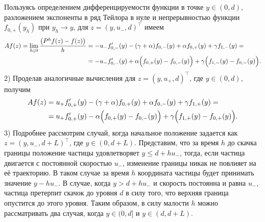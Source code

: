 \documentclass[12pt,a4paper]{article}
\begin{document}
Пользуясь определением дифференцируемости функции в точке $y \in (0, d)$, разложением экспоненты в ряд Тейлора в нуле и непрерывностью функции $f_{0,+} (y_h)$ при $y_h \to y$, для $z = \left(y, u_-, d\right)^\intercal$ имеем 
\begin{equation*}
    \begin{aligned}
   A f(z) = \lim_{h \downarrow 0} \frac{\left( P^h f(z) - f(z) \right)}{h} &= -u_- f_{0,-}' (y) - (\gamma + \alpha) f_{0,-}(y) + \alpha f_{0,+} (y) + \gamma f_{1,-} (y) = \\
   &= -u_- f_{0,-}' (y) + \alpha \Bigl(f_{0,+}(y) - f_{0,-}(y) \Bigr) + \gamma \Bigl(f_{1,-} (y) - f_{0,-} (y) \Bigr).
    \end{aligned}
\end{equation*}
2) Проделав аналогичные вычисления для $z = \left(y, u_+, d\right)^\intercal$, где $y \in (0, d)$, получим
\begin{equation*}
    \begin{aligned}
   A f(z) &= u_+ f_{0,+}' (y) - (\gamma + \alpha) f_{0,+} (y) + \alpha f_{0,-} (y) + \gamma f_{1,+} (y) = \\
   &= u_+ f_{0,+}' (y) - \alpha \Bigl(f_{0,+}(y) - f_{0,-}(y) \Bigr) + \gamma \Bigl(f_{1,+} (y) - f_{0,+} (y) \Bigr).
    \end{aligned}
\end{equation*}
3) Подробнее рассмотрим случай, когда начальное положение задается как \\
$z = \left(y, u_-, d + L\right)^\intercal$, где $y \in (0, d + L)$. Представим, что за время $h$ до скачка границы положение частицы удовлетворяет $y \leq d + h u_-$, тогда, если частица двигается с постоянной скоростью $u_-$, изменение границы никак не повлияет на её траекторию. В таком случае за время $h$ координата частицы будет принимать значение $y - h u_-$. В случае, когда $y > d + h u_-$ и скорость постоянна и равна $u_-$, частица претерпит скачок до уровня $d$ в силу того, что верхняя граница опустится до этого уровня. Таким образом, в силу малости $h$ можно рассматривать два случая, когда $y \in (0, d]$ и $y \in (d, d + L)$.
\end{document}
